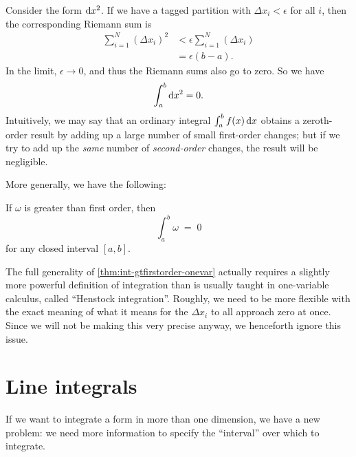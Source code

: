 \documentclass[12pt]{amsart}
\begin{document}
\begin{eg}
  Consider the form $\mathrm{d} x^2$.
  If we have a tagged partition with $\Delta x_i < \epsilon$ for all $i$, then the corresponding Riemann sum is
  \begin{align*}
    \sum_{i=1}^N (\Delta x_i)^2 &< \epsilon \sum_{i=1}^N (\Delta x_i)\\
    &= \epsilon (b-a).
  \end{align*}
  In the limit, $\epsilon \to 0$, and thus the Riemann sums also go to zero.
  So we have
  \[ \int_a^b \mathrm{d} x^2 = 0. \]
  Intuitively, we may say that an ordinary integral $\int_a^b f(x) \,\mathrm{d} x$ obtains a zeroth-order result by adding up a large number of small first-order changes; but if we try to add up the \emph{same} number of \emph{second-order} changes, the result will be negligible.
\end{eg}

More generally, we have the following:

\begin{thm}\label{thm:int-gtfirstorder-onevar}
  If $\omega$ is greater than first order, then
  \[ \int_a^b \omega \;=\; 0\]
  for any closed interval $[a,b]$.
\end{thm}

\begin{adv}
  The full generality of \cref{thm:int-gtfirstorder-onevar} actually requires a slightly more powerful definition of integration than is usually taught in one-variable calculus, called ``Henstock integration''.
  Roughly, we need to be more flexible with the exact meaning of what it means for the $\Delta x_i$ to all approach zero at once.
  Since we will not be making this very precise anyway, we henceforth ignore this issue.
\end{adv}

\section{Line integrals}
\label{sec:line-integrals}

If we want to integrate a form in more than one dimension, we have a new problem: we need more information to specify the ``interval'' over which to integrate.
\end{document}
